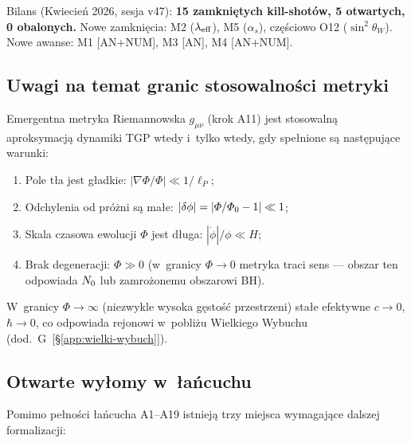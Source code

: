 \noindent Bilans (Kwiecie\'n 2026, sesja v47):
\textbf{15 zamkni\k{e}tych kill-shot\'ow, 5 otwartych, 0 obalonych.}
Nowe zamkni\k{e}cia: M2 ($\lambda_{\rm eff}$), M5 ($\alpha_s$),
cz\k{e}\'sciowo O12 ($\sin^2\theta_W$).
Nowe awanse: M1 [AN+NUM], M3 [AN], M4 [AN+NUM].

\subsection{Uwagi na temat granic stosowalności metryki}\label{app:H-granice}

\begin{remark}\label{rem:H-metric-domain}
  Emergentna metryka Riemannowska $g_{\mu\nu}$ (krok A11)
  jest stosowaln\k{a} aproksymacj\k{a} dynamiki TGP wtedy
  i~tylko wtedy, gdy spe\l{}nione s\k{a} nast\k{e}puj\k{a}ce
  warunki:
  \begin{enumerate}[nosep,label=(\roman*)]
    \item Pole t\l{}a jest g\l{}adkie: $|\nabla\Phi / \Phi| \ll 1/\ell_P$;
    \item Odchylenia od pr\'o\.zni s\k{a} ma\l{}e:
          $|\delta\phi| = |\varPhi/\varPhi_0 - 1| \ll 1$;
    \item Skala czasowa ewolucji $\Phi$ jest d\l{}uga: $|\dot\phi|/\phi \ll H$;
    \item Brak degeneracji: $\Phi \gg 0$
          (w~granicy $\Phi \to 0$ metryka traci sens --- obszar ten
          odpowiada $N_0$ lub zamro\.zonemu obszarowi BH).
  \end{enumerate}
  W~granicy $\Phi \to \infty$ (niezwykle wysoka g\k{e}sto\'s\'c
  przestrzeni) sta\l{}e efektywne $c \to 0$, $\hbar \to 0$,
  co odpowiada rejonowi w~pobli\.zu Wielkiego Wybuchu
  (dod.~G~[\S\ref{app:wielki-wybuch}]).
\end{remark}

\subsection{Otwarte wy\l{}omy w~\l{}a\'ncuchu}\label{app:H-luki}

Pomimo pe\l{}no\'sci \l{}a\'ncucha A1--A19 istniej\k{a} trzy miejsca
wymagaj\k{a}ce dalszej formalizacji:

